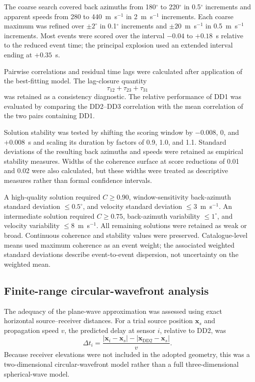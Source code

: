 \documentclass[]{seismica}
\begin{document}
The coarse search covered back azimuths from 180$^\circ$ to 220$^\circ$ in 0.5$^\circ$ increments and apparent speeds from 280 to 440~m~s$^{-1}$ in 2~m~s$^{-1}$ increments. Each coarse maximum was refined over $\pm2^\circ$ in 0.1$^\circ$ increments and $\pm20$~m~s$^{-1}$ in 0.5~m~s$^{-1}$ increments. Most events were scored over the interval $-0.04$ to $+0.18$~s relative to the reduced event time; the principal explosion used an extended interval ending at $+0.35$~s.

Pairwise correlations and residual time lags were calculated after application of the best-fitting model. The lag-closure quantity
\begin{equation}
  \tau_{12}+\tau_{23}+\tau_{31}
  \label{eq:lag_closure}
\end{equation}
was retained as a consistency diagnostic. The relative performance of DD1 was evaluated by comparing the DD2--DD3 correlation with the mean correlation of the two pairs containing DD1.

Solution stability was tested by shifting the scoring window by $-0.008$, 0, and $+0.008$~s and scaling its duration by factors of 0.9, 1.0, and 1.1. Standard deviations of the resulting back azimuths and speeds were retained as empirical stability measures. Widths of the coherence surface at score reductions of 0.01 and 0.02 were also calculated, but these widths were treated as descriptive measures rather than formal confidence intervals.

A high-quality solution required $C\geq0.90$, window-sensitivity back-azimuth
standard deviation $\leq0.5^\circ$, and velocity standard deviation
$\leq3$~m~s$^{-1}$. An intermediate solution required $C\geq0.75$,
back-azimuth variability $\leq1^\circ$, and velocity variability
$\leq8$~m~s$^{-1}$. All remaining solutions were retained as weak or broad.
Continuous coherence and stability values were preserved. Catalogue-level
means used maximum coherence as an event weight; the associated weighted
standard deviations describe event-to-event dispersion, not uncertainty on the
weighted mean.

\subsection{Finite-range circular-wavefront analysis}

The adequacy of the plane-wave approximation was assessed using exact horizontal source--receiver distances. For a trial source position $\mathbf{x}_s$ and propagation speed $v$, the predicted delay at sensor $i$, relative to DD2, was
\begin{equation}
  \Delta t_i = \frac{|\mathbf{x}_i-\mathbf{x}_s|-|\mathbf{x}_{\mathrm{DD2}}-\mathbf{x}_s|}{v}.
  \label{eq:circular_delay}
\end{equation}
Because receiver elevations were not included in the adopted geometry, this was a two-dimensional circular-wavefront model rather than a full three-dimensional spherical-wave model.
\end{document}

